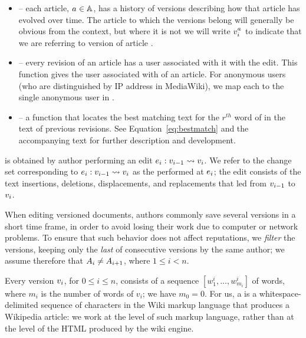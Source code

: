 \begin{itemize}
\item {} -- each article, $a_{} \in \mathbb{A}$,
    has a history of versions
    describing how that article has evolved over time.
    The article to which the versions belong will generally be
    obvious from the context, but where it is not we will
    write $v_{i}^{a_{}}$ to indicate that we
    are referring to version  of article \article{}.

\item {} -- every revision of an article has
    a user associated with it with the edit.
    This function gives the user associated with  of
    an article.
    For anonymous users (who are distinguished by IP address in
    MediaWiki), we map each to the single anonymous user in \users.

\item {} -- a function
    that locates the best matching text for the $r^{th}$ word of
     in the text of previous revisions.
    See Equation~\ref{eq:bestmatch} and the accompanying text
    for further description and development.

\end{itemize}
\renewcommand{\labelitemi}{$\bullet$}


is obtained by author  performing an
edit $e_{i}: v_{i-1} \rightsquigarrow v_{i}$.
We refer to the change set corresponding to
$e_{i}: v_{i-1} \rightsquigarrow v_{i}$
as the  performed at $e_{i}$; the edit consists of the text
insertions, deletions, displacements, and replacements that led from
$v_{i-1}$ to $v_{i}$.

When editing versioned documents, authors commonly save several
versions in a short time frame, in order to avoid losing their work
due to computer or network problems.
To ensure that such behavior does not affect reputations, we
\textit{filter} the versions, keeping only the \textit{last} of consecutive
versions by the same author; we assume therefore that
$A_{i} \neq A_{i+1}$,
where $1 \leq i < n$.

Every version $v_{i}$, for $0 \leq i \leq n$, consists of a sequence
$[w^i_1, \ldots, w^i_{m_i}]$ of words, where $m_i$ is the number of
words of $v_i$; we have $m_0 = 0$.
For us, a  is a whitespace-delimited sequence of
characters in the Wiki markup language that produces a Wikipedia article:
we work at the level of such markup language, rather than at the level
of the HTML produced by the wiki engine.

